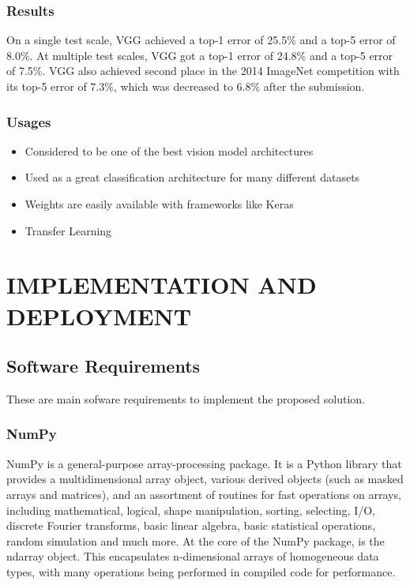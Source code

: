 \subsection{Results}
On a single test scale, VGG achieved a top-1 error of 25.5\% and a top-5 error of 8.0\%. At multiple test scales, VGG got a top-1 error of 24.8\% and a top-5 error of 7.5\%. VGG also achieved second place in the 2014 ImageNet competition with its top-5 error of 7.3\%, which was decreased to 6.8\% after the submission.

\subsection{Usages}
\begin{itemize}
    \item Considered to be one of the best vision model architectures
    \item Used as a great classification architecture for many different datasets
    \item Weights are easily available with frameworks like Keras
    \item Transfer Learning
\end{itemize}


\chapter{IMPLEMENTATION AND DEPLOYMENT}

\section{Software Requirements}
These are main sofware requirements to implement the proposed solution.

\subsection{NumPy}
NumPy is a general-purpose array-processing package.  It is a Python library that provides a multidimensional array object, various derived objects (such as masked arrays and matrices), and an assortment of routines for fast operations on arrays, including mathematical, logical, shape manipulation, sorting, selecting, I/O, discrete Fourier transforms, basic linear algebra, basic statistical operations, random simulation and much more.  At the core of the NumPy package, is the ndarray object.  This encapsulates n-dimensional arrays of homogeneous data types, with many operations being performed in compiled code for performance.

